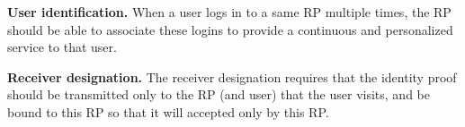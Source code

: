 \vspace{1mm}\noindent\textbf{User identification.} When a user logs in to a same RP multiple times, the RP should be able to associate these logins to provide a continuous and personalized service to that user. %

\vspace{1mm}\noindent\textbf{Receiver designation.} The receiver designation requires that the identity proof should  be  transmitted only to the RP (and user) that the user visits, and be bound to this RP so that it will accepted only by this RP. %

